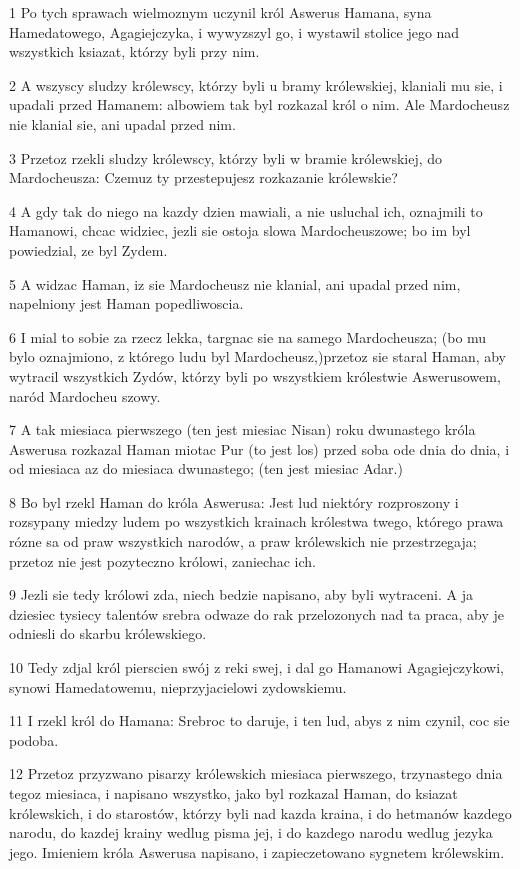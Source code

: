 \par 1 Po tych sprawach wielmoznym uczynil król Aswerus Hamana, syna Hamedatowego, Agagiejczyka, i wywyzszyl go, i wystawil stolice jego nad wszystkich ksiazat, którzy byli przy nim.
\par 2 A wszyscy sludzy królewscy, którzy byli u bramy królewskiej, klaniali mu sie, i upadali przed Hamanem: albowiem tak byl rozkazal król o nim. Ale Mardocheusz nie klanial sie, ani upadal przed nim.
\par 3 Przetoz rzekli sludzy królewscy, którzy byli w bramie królewskiej, do Mardocheusza: Czemuz ty przestepujesz rozkazanie królewskie?
\par 4 A gdy tak do niego na kazdy dzien mawiali, a nie usluchal ich, oznajmili to Hamanowi, chcac widziec, jezli sie ostoja slowa Mardocheuszowe; bo im byl powiedzial, ze byl Zydem.
\par 5 A widzac Haman, iz sie Mardocheusz nie klanial, ani upadal przed nim, napelniony jest Haman popedliwoscia.
\par 6 I mial to sobie za rzecz lekka, targnac sie na samego Mardocheusza; (bo mu bylo oznajmiono, z którego ludu byl Mardocheusz,)przetoz sie staral Haman, aby wytracil wszystkich Zydów, którzy byli po wszystkiem królestwie Aswerusowem, naród Mardocheu szowy.
\par 7 A tak miesiaca pierwszego (ten jest miesiac Nisan) roku dwunastego króla Aswerusa rozkazal Haman miotac Pur (to jest los) przed soba ode dnia do dnia, i od miesiaca az do miesiaca dwunastego; (ten jest miesiac Adar.)
\par 8 Bo byl rzekl Haman do króla Aswerusa: Jest lud niektóry rozproszony i rozsypany miedzy ludem po wszystkich krainach królestwa twego, którego prawa rózne sa od praw wszystkich narodów, a praw królewskich nie przestrzegaja; przetoz nie jest pozyteczno królowi, zaniechac ich.
\par 9 Jezli sie tedy królowi zda, niech bedzie napisano, aby byli wytraceni. A ja dziesiec tysiecy talentów srebra odwaze do rak przelozonych nad ta praca, aby je odniesli do skarbu królewskiego.
\par 10 Tedy zdjal król pierscien swój z reki swej, i dal go Hamanowi Agagiejczykowi, synowi Hamedatowemu, nieprzyjacielowi zydowskiemu.
\par 11 I rzekl król do Hamana: Srebroc to daruje, i ten lud, abys z nim czynil, coc sie podoba.
\par 12 Przetoz przyzwano pisarzy królewskich miesiaca pierwszego, trzynastego dnia tegoz miesiaca, i napisano wszystko, jako byl rozkazal Haman, do ksiazat królewskich, i do starostów, którzy byli nad kazda kraina, i do hetmanów kazdego narodu, do kazdej krainy wedlug pisma jej, i do kazdego narodu wedlug jezyka jego. Imieniem króla Aswerusa napisano, i zapieczetowano sygnetem królewskim.
